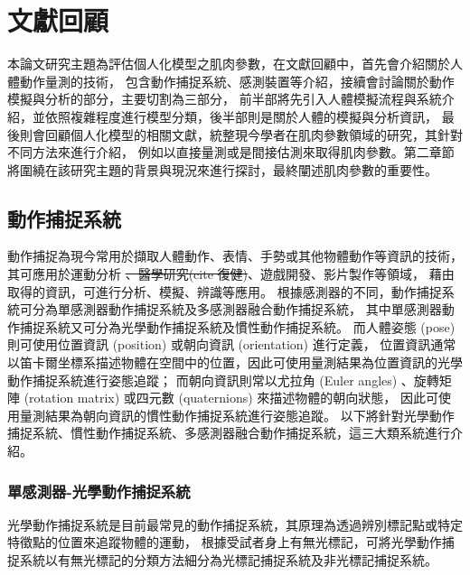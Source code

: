 \chapter{文獻回顧}
\fontsize{12pt}{18pt}\selectfont %

本論文研究主題為評估個人化模型之肌肉參數，在文獻回顧中，首先會介紹關於人體動作量測的技術，
包含動作捕捉系統、感測裝置等介紹，接續會討論關於動作模擬與分析的部分，主要切割為三部分，
前半部將先引入人體模擬流程與系統介紹，並依照複雜程度進行模型分類，後半部則是關於人體的模擬與分析資訊，
最後則會回顧個人化模型的相關文獻，統整現今學者在肌肉參數領域的研究，其針對不同方法來進行介紹，
例如以直接量測或是間接估測來取得肌肉參數。第二章節將圍繞在該研究主題的背景與現況來進行探討，最終闡述肌肉參數的重要性。

\section{動作捕捉系統}
動作捕捉為現今常用於擷取人體動作、表情、手勢或其他物體動作等資訊的技術，其可應用於運動分析 \sout{、醫學研究(cite 復健)}、遊戲開發、影片製作等領域，
藉由取得的資訊，可進行分析、模擬、辨識等應用。
根據感測器的不同，動作捕捉系統可分為單感測器動作捕捉系統及多感測器融合動作捕捉系統，
其中單感測器動作捕捉系統又可分為光學動作捕捉系統及慣性動作捕捉系統。
而人體姿態 (pose) 則可使用位置資訊 (position) 或朝向資訊 (orientation) 進行定義，
位置資訊通常以笛卡爾坐標系描述物體在空間中的位置，因此可使用量測結果為位置資訊的光學動作捕捉系統進行姿態追蹤；
而朝向資訊則常以尤拉角 (Euler angles) 、旋轉矩陣 (rotation matrix) 或四元數 (quaternions) 來描述物體的朝向狀態，
因此可使用量測結果為朝向資訊的慣性動作捕捉系統進行姿態追蹤。
以下將針對光學動作捕捉系統、慣性動作捕捉系統、多感測器融合動作捕捉系統，這三大類系統進行介紹。

\subsection{單感測器-光學動作捕捉系統}
光學動作捕捉系統是目前最常見的動作捕捉系統，其原理為透過辨別標記點或特定特徵點的位置來追蹤物體的運動，
根據受試者身上有無光標記，可將光學動作捕捉系統以有無光標記的分類方法細分為光標記捕捉系統及非光標記捕捉系統。

